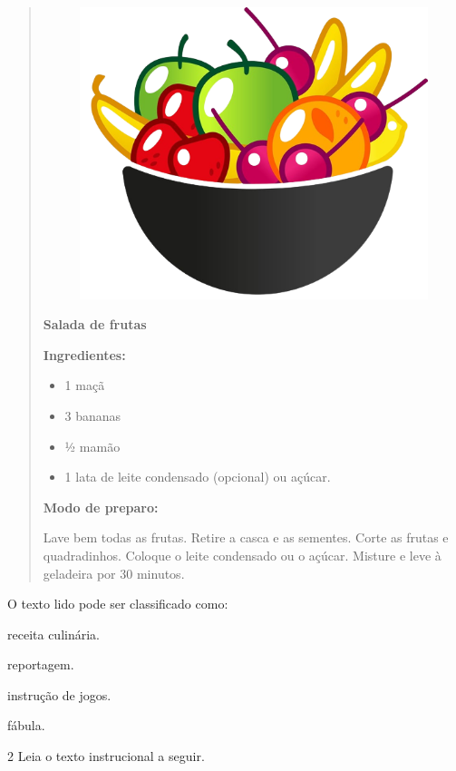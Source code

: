 \begin{quote}
\begin{figure}
\includegraphics[width=.5\textwidth]{media/image12.png}
\end{figure}

\textbf{Salada de frutas}

\textbf{Ingredientes:}

\begin{itemize}
\item 1 maçã

\item 3 bananas

\item ½ mamão

\item 1 lata de leite condensado (opcional) ou açúcar.
\end{itemize}

\textbf{Modo de preparo:}

Lave bem todas as frutas. Retire a casca e as sementes. Corte as frutas
e quadradinhos. Coloque o leite condensado ou o açúcar. Misture e leve à
geladeira por 30 minutos.
\end{quote}

\pagebreak
O texto lido pode ser classificado como:

\begin{escolha}
\item
  receita culinária.
\item
  reportagem.
\item
  instrução de jogos.
\item
  fábula.
\end{escolha}

\num{2} Leia o texto instrucional a seguir.



